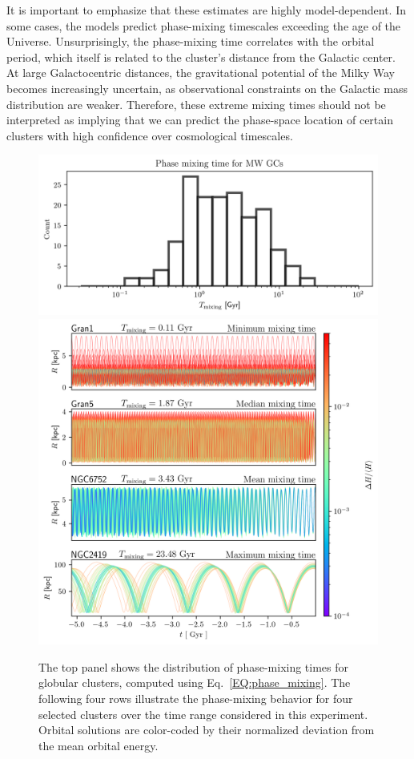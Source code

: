            It is important to emphasize that these estimates are highly model-dependent. In some cases, the models predict phase-mixing timescales exceeding the age of the Universe. Unsurprisingly, the phase-mixing time correlates with the orbital period, which itself is related to the cluster's distance from the Galactic center. At large Galactocentric distances, the gravitational potential of the Milky Way becomes increasingly uncertain, as observational constraints on the Galactic mass distribution are weaker. Therefore, these extreme mixing times should not be interpreted as implying that we can predict the phase-space location of certain clusters with high confidence over cosmological timescales. 



            \begin{figure}
                \centering
                \includegraphics[width=.75\linewidth]{images/phase_mixing_time_histogram_MWGCS.png}
                \includegraphics[width=\linewidth]{images/phase_mixing_orbital_errors_sample.png}
                \caption{The top panel shows the distribution of phase-mixing times for globular clusters, computed using Eq.~\ref{EQ:phase_mixing}. The following four rows illustrate the phase-mixing behavior for four selected clusters over the time range considered in this experiment. Orbital solutions are color-coded by their normalized deviation from the mean orbital energy.}
                \label{fig:phase_mixing_orbital_errors_sample}
            \end{figure}
     
